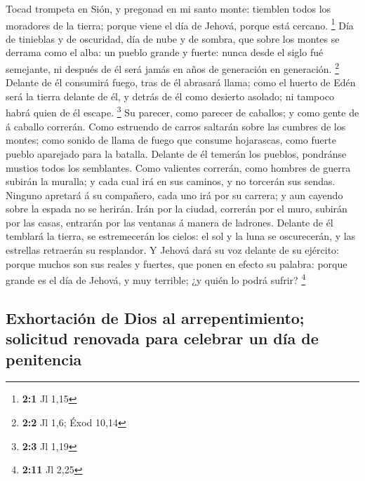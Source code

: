 Tocad trompeta en Sión, y pregonad en mi santo monte:
tiemblen todos los moradores de la tierra; porque viene el día de
Jehová, porque está cercano. \footnote{\textbf{2:1} Jl 1,15}
 Día de tinieblas y de oscuridad, día de nube y de sombra,
que sobre los montes se derrama como el alba: un pueblo grande y fuerte:
nunca desde el siglo fué semejante, ni después de él será jamás en años
de generación en generación. \footnote{\textbf{2:2} Jl 1,6; Éxod 10,14}
 Delante de él consumirá fuego, tras de él abrasará llama;
como el huerto de Edén será la tierra delante de él, y detrás de él como
desierto asolado; ni tampoco habrá quien de él escape. \footnote{\textbf{2:3}
  Jl 1,19}  Su parecer, como parecer de caballos; y como
gente de á caballo correrán.  Como estruendo de carros
saltarán sobre las cumbres de los montes; como sonido de llama de fuego
que consume hojarascas, como fuerte pueblo aparejado para la batalla.
 Delante de él temerán los pueblos, pondránse mustios
todos los semblantes.  Como valientes correrán, como
hombres de guerra subirán la muralla; y cada cual irá en sus caminos, y
no torcerán sus sendas.  Ninguno apretará á su compañero,
cada uno irá por su carrera; y aun cayendo sobre la espada no se
herirán.  Irán por la ciudad, correrán por el muro,
subirán por las casas, entrarán por las ventanas á manera de ladrones.
 Delante de él temblará la tierra, se estremecerán los
cielos: el sol y la luna se oscurecerán, y las estrellas retraerán su
resplandor.  Y Jehová dará su voz delante de su ejército:
porque muchos son sus reales y fuertes, que ponen en efecto su palabra:
porque grande es el día de Jehová, y muy terrible; ¿y quién lo podrá
sufrir? \footnote{\textbf{2:11} Jl 2,25}

\hypertarget{exhortaciuxf3n-de-dios-al-arrepentimiento-solicitud-renovada-para-celebrar-un-duxeda-de-penitencia}{%
\subsection{Exhortación de Dios al arrepentimiento; solicitud renovada
para celebrar un día de
penitencia}\label{exhortaciuxf3n-de-dios-al-arrepentimiento-solicitud-renovada-para-celebrar-un-duxeda-de-penitencia}}


